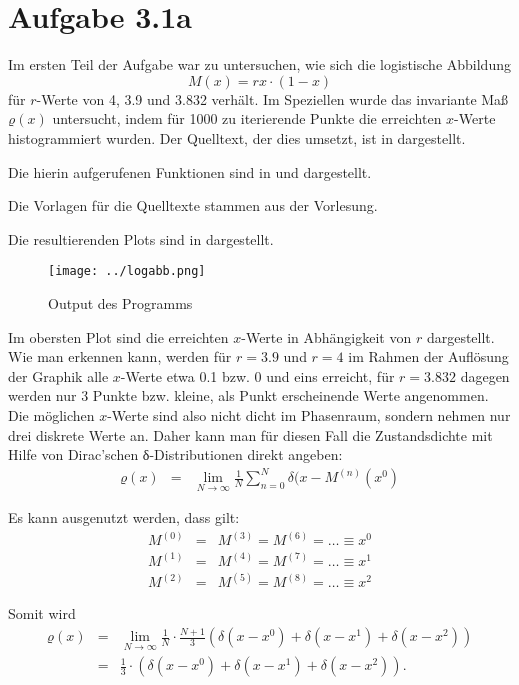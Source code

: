 \section*{Aufgabe 3.1a}
Im ersten Teil der Aufgabe war zu untersuchen, wie sich die logistische
Abbildung $$M(x) = rx\cdot (1-x)$$ für $r$-Werte von 4, 3.9 und 3.832 verhält.
Im Speziellen wurde das invariante Maß $ϱ(x)$ untersucht, indem für 1000 zu
iterierende Punkte die erreichten $x$-Werte histogrammiert wurden. Der
Quelltext, der dies umsetzt, ist in  dargestellt.



Die hierin aufgerufenen Funktionen sind in  und 
dargestellt.





Die Vorlagen für die Quelltexte stammen aus der Vorlesung. 

Die resultierenden Plots sind in  dargestellt.
\begin{figure}[htb]
\centering
  \texttt{[image: ../logabb.png]}
  \caption{Output des Programms}
  \label{fig:logabb}
\end{figure}

Im obersten Plot sind die erreichten $x$-Werte in Abhängigkeit von $r$
dargestellt. Wie man erkennen kann, werden für $r=3.9$ und $r=4$ im Rahmen der
Auflösung der Graphik alle $x$-Werte etwa 0.1 bzw. 0 und eins erreicht, für
$r=3.832$ dagegen werden nur 3 Punkte bzw. kleine, als Punkt erscheinende Werte
angenommen. Die möglichen $x$-Werte sind also nicht dicht im Phasenraum,
sondern nehmen nur drei diskrete Werte an. Daher kann man für diesen Fall die
Zustandsdichte mit Hilfe von Dirac’schen δ-Distributionen direkt angeben:
\begin{eqnarray}
ϱ(x) &=& \lim_{N\to\infty}\frac{1}{N}\sum_{n=0}^{N}δ(x - M^{(n)}(x^0)
\end{eqnarray}

Es kann ausgenutzt werden, dass gilt:
\begin{eqnarray}
M^{(0)} &=& M^{(3)} = M^{(6)} = … \equiv x^0\\
M^{(1)} &=& M^{(4)} = M^{(7)} = … \equiv x^1\\
M^{(2)} &=& M^{(5)} = M^{(8)} = … \equiv x^2
\end{eqnarray}

Somit wird
\begin{eqnarray}
ϱ(x) &=& \lim_{N\to\infty}\frac{1}{N}\cdot\frac{N+1}{3}(δ(x - x^0) + δ(x
- x^1) + δ(x - x^2))\\
&=& \frac{1}{3}\cdot(δ(x - x^0) + δ(x - x^1) + δ(x - x^2)).
\end{eqnarray}
